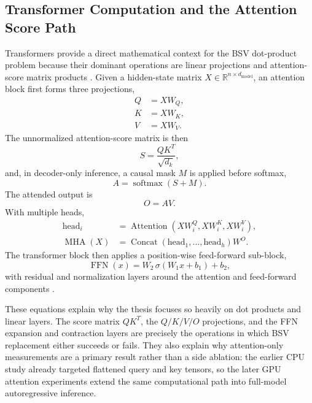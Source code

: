 \subsection{Transformer Computation and the Attention Score Path}
Transformers provide a direct mathematical context for the BSV dot-product problem because their dominant operations are linear projections and attention-score matrix products \cite{attention,bert,opt}. Given a hidden-state matrix $X \in \mathbb{R}^{n \times d_{\mathrm{model}}}$, an attention block first forms three projections,
\begin{align}
Q &= XW_Q, \\
K &= XW_K, \\
V &= XW_V.
\end{align}
The unnormalized attention-score matrix is then
\begin{equation}
S = \frac{QK^{T}}{\sqrt{d_k}},
\end{equation}
and, in decoder-only inference, a causal mask $M$ is applied before softmax,
\begin{equation}
A = \operatorname{softmax}(S + M).
\end{equation}
The attended output is
\begin{equation}
O = AV.
\end{equation}
With multiple heads,
\begin{align}
\mathrm{head}_i &= \operatorname{Attention}(XW_i^Q, XW_i^K, XW_i^V), \\
\operatorname{MHA}(X) &= \operatorname{Concat}(\mathrm{head}_1,\ldots,\mathrm{head}_h)W^O.
\end{align}
The transformer block then applies a position-wise feed-forward sub-block,
\begin{equation}
\operatorname{FFN}(x) = W_2\,\sigma(W_1 x + b_1) + b_2,
\end{equation}
with residual and normalization layers around the attention and feed-forward components \cite{attention,bert,opt}.

These equations explain why the thesis focuses so heavily on dot products and linear layers. The score matrix $QK^T$, the $Q/K/V/O$ projections, and the FFN expansion and contraction layers are precisely the operations in which BSV replacement either succeeds or fails. They also explain why attention-only measurements are a primary result rather than a side ablation: the earlier CPU study already targeted flattened query and key tensors, so the later GPU attention experiments extend the same computational path into full-model autoregressive inference.

